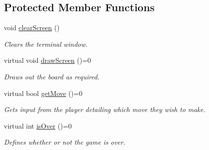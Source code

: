 \subsection*{Protected Member Functions}
\begin{DoxyCompactItemize}
\item 
void \hyperlink{classGame_a43a51eaa8b6fdb3dc6faa4d3417bad1e}{clear\-Screen} ()
\begin{DoxyCompactList}\small\item\em Clears the terminal window. \end{DoxyCompactList}\item 
virtual void \hyperlink{classGame_a7034c849d9fb62c74edb0a43f66b3bba}{draw\-Screen} ()=0
\begin{DoxyCompactList}\small\item\em Draws out the board as required. \end{DoxyCompactList}\item 
virtual bool \hyperlink{classGame_a4986ef96dee8f573ba1532dfe3ee8a4a}{get\-Move} ()=0
\begin{DoxyCompactList}\small\item\em Gets input from the player detailing which move they wish to make. \end{DoxyCompactList}\item 
virtual int \hyperlink{classGame_ada584c598be0f7066a396e1677ad7dc6}{is\-Over} ()=0
\begin{DoxyCompactList}\small\item\em Defines whether or not the game is over. \end{DoxyCompactList}\end{DoxyCompactItemize}

